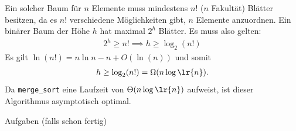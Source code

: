 \begin{frame}
Ein solcher Baum für $n$ Elemente muss mindestens $n!$ ($n$ Fakultät) Blätter besitzen, da es $n!$ verschiedene Möglichkeiten gibt, $n$ Elemente anzuordnen. Ein binärer Baum der Höhe $h$ hat maximal $2^h$ Blätter. Es muss also gelten:
\begin{align*}
	2^h \geq n! \implies h \geq \log_2(n!)
\end{align*}
Es gilt $\ln(n!) = n \ln n - n + O(\ln(n))$ und somit 
\begin{align*}
	h \geq \log_2(n!) = \Omega(n\log\lr{n}).
\end{align*}
Da \lstinline{merge_sort} eine Laufzeit von $\Theta(n \log\lr{n})$ aufweist, ist dieser Algorithmus asymptotisch optimal.
\end{frame}

\begin{frame}[fragile]{Aufgaben (falls schon fertig)}
\end{frame}